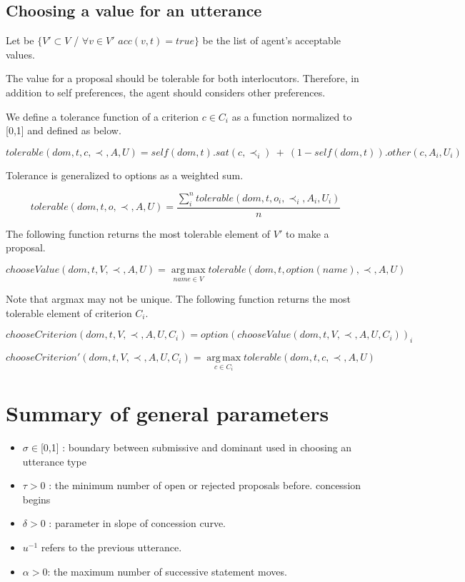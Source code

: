 \documentclass{article}
\begin{document}
	\subsection{Choosing a value for an utterance}
	Let be $\{V' \subset V$ / $\forall v \in V'$ $ acc(v,t) = true\}$ be the list of agent's acceptable values. 
	
	The value for a proposal should be tolerable for both interlocutors. Therefore,  in addition to self preferences, the agent should considers other preferences. 
	
	   We define a tolerance function of a criterion $c \in C_i$ as a function normalized to [0,1] and defined as below.
	 
	 $$tolerable(dom, t, c, \prec, A, U) = self(dom, t) . sat(c, \prec_i) \ +\  (1 - self(dom, t)) . other(c, A_i, U_i)$$
	 
	 Tolerance is generalized to options as a weighted sum.
	 
	 $$tolerable(dom, t, o, \prec, A, U) = \frac{ \sum_{i}^{n} tolerable(dom, t, o_i, \prec_i, A_i, U_i) } {n}$$ 
	 
	 
	 
		The following function returns the most tolerable element of $V'$ to make a proposal.

	 $$ chooseValue(dom, t, V, \prec, A, U) =	\operatorname*{arg\,max}_{name \in V} tolerable(dom, t, option(name), \prec, A, U) $$
	
	Note that argmax may not be unique.  The following function returns the most tolerable element of	criterion $C_i$.
	
	$$chooseCriterion(dom, t, V, \prec, A, U, C_i) = option(chooseValue(dom, t, V, \prec, A, U, C_i))_i$$
	

	$$chooseCriterion'(dom, t, V, \prec, A, U, C_i) =	\operatorname*{arg\,max}_{c\in C_i} tolerable(dom, t, c, \prec, A, U)$$
	

	\section{Summary of general parameters }
	\begin{itemize}

		\item $\sigma \in $[0,1] : boundary between submissive and dominant used in
				choosing an utterance type
		\item $\tau > 0$ : the minimum number of open or rejected proposals before.
				concession begins
		\item $\delta > 0$ : parameter in slope of concession curve.
		\item $u^{-1}$ refers to the previous utterance.
		\item $\alpha> 0$: the maximum number of successive statement moves.
		
		
	\end{itemize}

	
%	
%	
%	
	
\end{document}
